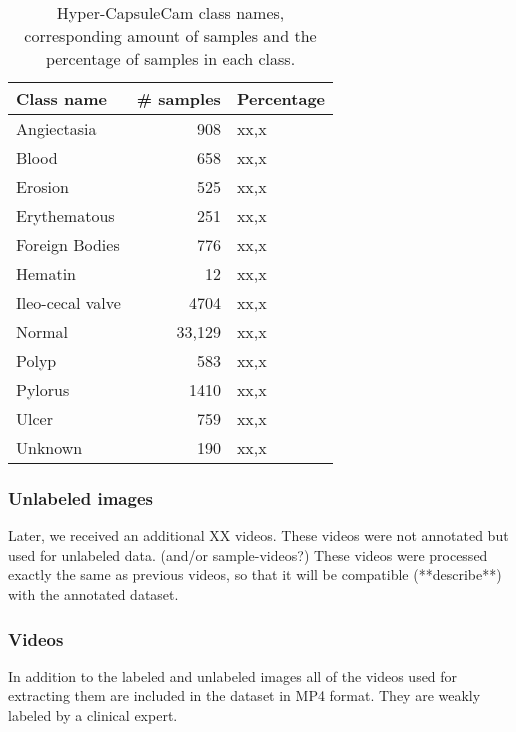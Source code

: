 \documentclass[thesis.tex]{subfiles}
\begin{document}
\begin{table} %
  \centering
  \begin{tabular}{|l|r|l|}
  	\hline
  	Class name & \# samples & Percentage \\
    \hline
    Angiectasia		& 908	& xx,x \\ 
    Blood			& 658	& xx,x \\ 
    Erosion			& 525	& xx,x \\ 
    Erythematous	& 251	& xx,x \\
    Foreign Bodies	& 776	& xx,x \\
    Hematin			& 12	& xx,x \\
    Ileo-cecal valve& 4704	& xx,x \\
    Normal			& 33,129& xx,x \\
    Polyp			& 583	& xx,x \\
    Pylorus			& 1410	& xx,x \\
    Ulcer			& 759	& xx,x \\
    Unknown			& 190	& xx,x \\
    \hline
  \end{tabular}
  \caption[Hyper-CapsuleCam class names and number of samples.]{Hyper-CapsuleCam class names, corresponding amount of samples and the percentage of samples in each class.}
  \label{table:kvasir_pillcam_samples}
\end{table}



\subsubsection{Unlabeled images}
Later, we received an additional XX videos. These videos were not annotated but used for unlabeled data. (and/or sample-videos?)
These videos were processed exactly the same as previous videos, so that it will be compatible (**describe**) with the annotated dataset.


\subsubsection{Videos}
In addition to the labeled and unlabeled images all of the videos used for extracting them are included in the dataset in MP4 format. They are weakly labeled by a clinical expert.
\end{document}
